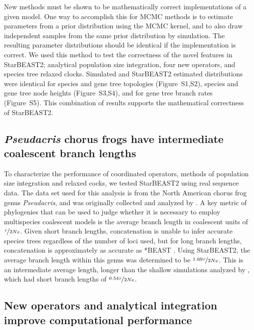 \documentclass[12pt]{article}
\begin{document}
New methods must be shown to be mathematically correct implementations of a
given model. One way to accomplish this for MCMC methods is to estimate
parameters from a prior distribution using the MCMC kernel, and to also draw
independent samples from the same prior distribution by simulation. The
resulting parameter distributions should be identical if the implementation is
correct. We used this method to test the correctness of the novel features in
StarBEAST2; analytical population size integration, four new operators, and
species tree relaxed clocks. Simulated and StarBEAST2 estimated distributions
were identical for species and gene tree topologies (Figure~S1,S2), species and
gene tree node heights (Figure~S3,S4), and for gene tree branch rates (Figure~S5).
This combination of results supports the mathematical correctness of StarBEAST2.

\subsection{\textit{Pseudacris} chorus frogs have intermediate coalescent branch lengths}

To characterize the performance of coordinated operators, methods of population size
integration and relaxed cocks, we tested StarBEAST2 using real sequence data.
The data set used for this analysis is from the North American chorus frog genus
\textit{Pseudacris}, and was originally collected and analyzed by
\cite{Barrow201478}. A key metric of phylogenies that can be used to judge
whether it is necessary to employ multispecies coalescent models is the average
branch length in coalescent units of $\nicefrac{\tau}{2Ne}$. Given short branch
lengths, concatenation is unable to infer accurate species trees regardless of
the number of loci used, but for long branch lengths, concatenation is
approximately as accurate as *BEAST \citep{Ogilvie01052016}. Using StarBEAST2,
the average branch length within this genus was determined to be
$\nicefrac{1.69\tau}{2Ne}$. This is an intermediate average length, longer than
the shallow simulations analyzed by \cite{Ogilvie01052016}, which had short
branch lengths of $\nicefrac{0.54\tau}{2Ne}$.

\subsection{New operators and analytical integration improve computational performance}
\end{document}
